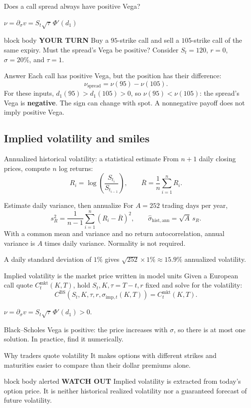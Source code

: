 \documentclass[handout,10pt,aspectratio=169]{beamer}
\newenvironment{simplificationbox}{\begin{beamercolorbox}[rounded=true,sep=0.7em,wd=\textwidth]{block body alerted}
  \textbf{\color{CourseRed}WATCH OUT}\quad}{\end{beamercolorbox}}
\newenvironment{pausebox}{\begin{beamercolorbox}[rounded=true,sep=0.8em,wd=\textwidth]{block body}
  \textbf{\color{CourseGold}YOUR TURN}\quad}{\end{beamercolorbox}}
\newcommand{\1}{\mathbf 1}
\newcommand{\Ncdf}{\Phi}
\newcommand{\greekrecall}[1]{\par{\small\color{CourseBlue}\(\displaystyle #1\)\par}}
\begin{document}
\begin{frame}{Does a call spread always have positive Vega?}
\greekrecall{\nu=\partial_\sigma v=S_t\sqrt{\tau}\,\Ncdf'(d_1)}
\begin{pausebox}
Buy a \(95\)-strike call and sell a \(105\)-strike call of the same expiry.
Must the spread's Vega be positive? Consider \(S_t=120\), \(r=0\),
\(\sigma=20\%\), and \(\tau=1\).
\end{pausebox}

\begin{exampleblock}{Answer}
Each call has positive Vega, but the position has their difference:
\[
\boxed{\nu_{\mathrm{spread}}=\nu(95)-\nu(105).}
\]
For these inputs, \(d_1(95)>d_1(105)>0\), so \(\nu(95)<\nu(105)\):
the spread's Vega is \textbf{negative}. The sign can change with spot.
A nonnegative payoff does not imply positive Vega.
\end{exampleblock}
\end{frame}

\subsection{Implied volatility and smiles}

\begin{frame}{Annualized historical volatility: a statistical estimate}
From \(n+1\) daily closing prices, compute \(n\) log returns:
\[
R_i=\log\!\left(\frac{S_{t_i}}{S_{t_{i-1}}}\right),
\qquad \overline R=\frac1n\sum_{i=1}^n R_i.
\]
\begin{block}{Estimate daily variance, then annualize}
For \(A=252\) trading days per year,
\[
s_R^2=\frac1{n-1}\sum_{i=1}^n(R_i-\overline R)^2,
\qquad
\boxed{\widehat\sigma_{\mathrm{hist,ann}}=\sqrt{A}\,s_R.}
\]
With a common mean and variance and no return autocorrelation, annual variance
is \(A\) times daily variance. Normality is not required.
\end{block}
A daily standard deviation of \(1\%\) gives
\(\sqrt{252}\times1\%\approx15.9\%\) annualized volatility.
\end{frame}

\begin{frame}{Implied volatility is the market price written in model units}
Given a European call quote \(C_t^{\mathrm{mkt}}(K,T)\), hold
\(S_t,K,\tau=T-t,r\) fixed and solve for the volatility:
\[
C^{\mathrm{BS}}\!\left(S_t,K,\tau,r,\sigma_{\mathrm{imp},t}(K,T)\right)
=C_t^{\mathrm{mkt}}(K,T).
\]
\greekrecall{\nu=\partial_\sigma v=S_t\sqrt{\tau}\,\Ncdf'(d_1)>0.}
Black--Scholes Vega is positive: the price increases with \(\sigma\), so
there is at most one solution. In practice, find it numerically.
\begin{block}{Why traders quote volatility}
It makes options with different strikes and maturities easier to compare than
their dollar premiums alone.
\end{block}
\begin{simplificationbox}
Implied volatility is extracted from today's option price. It is neither
historical realized volatility nor a guaranteed forecast of future volatility.
\end{simplificationbox}
\end{frame}
\end{document}
